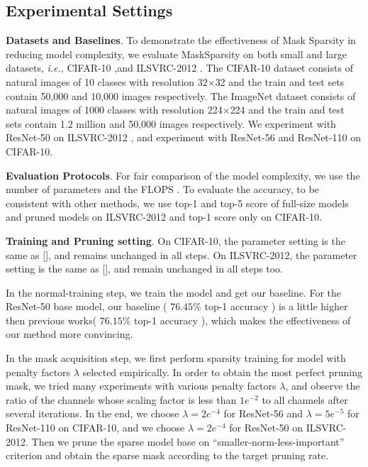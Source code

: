 \documentclass[review]{cvpr}
\begin{document}
\subsection{Experimental Settings}

\textbf{Datasets and Baselines}.
To demonstrate the effectiveness of Mask Sparsity in reducing model complexity, we evaluate MaskSparsity on both small and large datasets,  \emph{i.e.}, CIFAR-10 \cite{krizhevsky2009learning} ,and ILSVRC-2012 \cite{russakovsky2015imagenet}. The CIFAR-10 dataset consists of natural images of 10 classes with resolution 32$\times$32 and the train and test sets contain 50,000 and 10,000 images respectively. The ImageNet dataset consists of natural images of 1000 classes with resolution 224$\times$224 and the train and test sets contain 1.2 million and 50,000 images respectively.  We experiment with ResNet-50 \cite{He2016IdentityMI} on ILSVRC-2012 , and experiment with ResNet-56 \cite{he2016deep} and ResNet-110 \cite{he2016deep} on CIFAR-10.

\textbf{Evaluation Protocols}.
For fair comparison of the model complexity, we use the number of parameters and the FLOPS \cite{he2016deep}. To evaluate the accuracy, to be consistent with other methods, we use top-1 and top-5 score of full-size models and pruned models on ILSVRC-2012 and top-1 score only on CIFAR-10.

\textbf{Training and Pruning setting}.
On CIFAR-10, the parameter setting is the same as [], and remains unchanged in all steps. On ILSVRC-2012, the parameter setting is the same as [], and remain unchanged in all steps too. 

In the normal-training step, we train the model and get our baseline. For the ResNet-50 base model, our baseline ( $76.45\%$ top-1 accuracy ) is a little higher then previous works( $76.15\%$ top-1 accuracy ), which makes the effectiveness of our method more convincing.


In the mask acquisition step, we first perform sparsity training for model with penalty factors $\lambda$ selected empirically. In order to obtain the most perfect pruning mask, we tried many experiments with various penalty factors $\lambda$, and observe the ratio of the channels whose scaling factor is less than $1e^{-2}$ to all channels after several iterations. In the end, we choose $\lambda=2e^{-4}$ for ResNet-56 and $\lambda=5e^{-5}$ for ResNet-110 on CIFAR-10, and we choose $\lambda=2e^{-4}$ for ResNet-50 on ILSVRC-2012. Then we prune the sparse model base on “smaller-norm-less-important” criterion and obtain the sparse mask according to the target pruning rate. 
\end{document}
